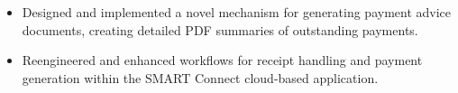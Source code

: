 \begin{itemize}
  \item Designed and implemented a novel mechanism for generating payment advice documents, creating detailed PDF summaries of outstanding payments.
  \item Reengineered and enhanced workflows for receipt handling and payment generation within the SMART Connect cloud-based application.
\end{itemize}
\divider
